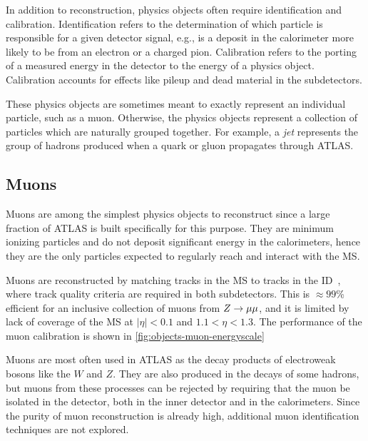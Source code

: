 In addition to reconstruction, physics objects often require identification and calibration. Identification refers to the determination of which particle is responsible for a given detector signal, e.g., is a deposit in the calorimeter more likely to be from an electron or a charged pion. Calibration refers to the porting of a measured energy in the detector to the energy of a physics object. Calibration accounts for effects like pileup and dead material in the subdetectors.

These physics objects are sometimes meant to exactly represent an individual particle, such as a muon. Otherwise, the physics objects represent a collection of particles which are naturally grouped together. For example, a \textit{jet} represents the group of hadrons produced when a quark or gluon propagates through ATLAS.

\subsection{Muons}

Muons are among the simplest physics objects to reconstruct since a large fraction of ATLAS is built specifically for this purpose. They are minimum ionizing particles and do not deposit significant energy in the calorimeters, hence they are the only particles expected to regularly reach and interact with the MS. 

Muons are reconstructed by matching tracks in the MS to tracks in the ID~\cite{PERF-2014-05}, where track quality criteria are required in both subdetectors. This is $\approx\! 99$\% efficient for an inclusive collection of muons from $Z \rightarrow \mu\mu$, and it is limited by lack of coverage of the MS at $|\eta| < 0.1$ and $1.1 < \eta < 1.3$. The performance of the muon calibration is shown in \cref{fig:objects-muon-energyscale}

Muons are most often used in ATLAS as the decay products of electroweak bosons like the $W$ and $Z$. They are also produced in the decays of some hadrons, but muons from these processes can be rejected by requiring that the muon be isolated in the detector, both in the inner detector and in the calorimeters. Since the purity of muon reconstruction is already high, additional muon identification techniques are not explored.

